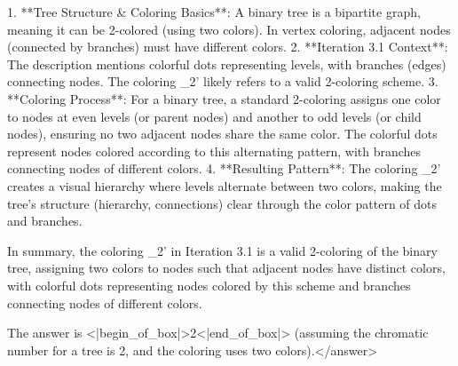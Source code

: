 1. **Tree Structure & Coloring Basics**: A binary tree is a bipartite graph, meaning it can be 2-colored (using two colors). In vertex coloring, adjacent nodes (connected by branches) must have different colors.  
2. **Iteration 3.1 Context**: The description mentions colorful dots representing levels, with branches (edges) connecting nodes. The coloring _2' likely refers to a valid 2-coloring scheme.  
3. **Coloring Process**: For a binary tree, a standard 2-coloring assigns one color to nodes at even levels (or parent nodes) and another to odd levels (or child nodes), ensuring no two adjacent nodes share the same color. The colorful dots represent nodes colored according to this alternating pattern, with branches connecting nodes of different colors.  
4. **Resulting Pattern**: The coloring _2' creates a visual hierarchy where levels alternate between two colors, making the tree’s structure (hierarchy, connections) clear through the color pattern of dots and branches.  

In summary, the coloring _2' in Iteration 3.1 is a valid 2-coloring of the binary tree, assigning two colors to nodes such that adjacent nodes have distinct colors, with colorful dots representing nodes colored by this scheme and branches connecting nodes of different colors.  

The answer is <|begin_of_box|>2<|end_of_box|> (assuming the chromatic number for a tree is 2, and the coloring uses two colors).</answer>